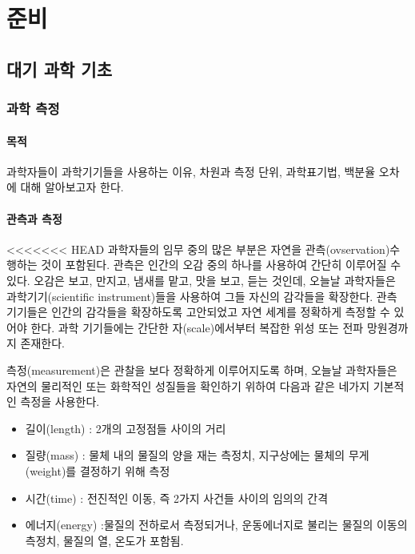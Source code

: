 \part{준비}

\usechapterimagetrue
{} %
\chapter{대기 과학 기초}


\section{과학 측정}

\subsection{목적}

과학자들이 과학기기들을 사용하는 이유, 차원과 측정 단위, 과학표기법, 백분율 오차에 대해 알아보고자 한다.

\subsection{관측과 측정}

<<<<<<< HEAD
과학자들의 임무 중의 많은 부분은 자연을 관측(ovservation)\을 수행하는 것이 포함된다. 관측은 인간의 오감 중의 하나를 사용하여 간단히 이루어질 수 있다. 오감은 보고, 만지고, 냄새를 맡고, 맛을 보고, 듣는 것인데, 오늘날 과학자들은 과학기기(scientific instrument)들을 사용하여 그들 자신의 감각들을 확장한다. 
관측 기기들은 인간의 감각들을 확장하도록 고안되었고 자연 세계를 정확하게 측정할 수 있어야 한다. 과학 기기들에는 간단한 자(scale)에서부터 복잡한 위성 또는 전파 망원경까지 존재한다. 

측정(measurement)은 관찰을 보다 정확하게 이루어지도록 하며, 오늘날 과학자들은 자연의 물리적인 또는 화학적인 성질들을 확인하기 위하여 다음과 같은 네가지 기본적인 측정을 사용한다.
\begin{itemize}
	\item 길이(length) : 2개의 고정점들 사이의 거리
	\item 질량(mass) : 물체 내의 물질의 양을 재는 측정치, 지구상에는 물체의 무게(weight)를 결정하기 위해 측정
	\item 시간(time) : 전진적인 이동, 즉 2가지 사건들 사이의 임의의 간격
	\item 에너지(energy) :물질의 전하로서 측정되거나, 운동에너지로 불리는 물질의 이동의 측정치, 물질의 열, 온도가 포함됨.
\end{itemize}

